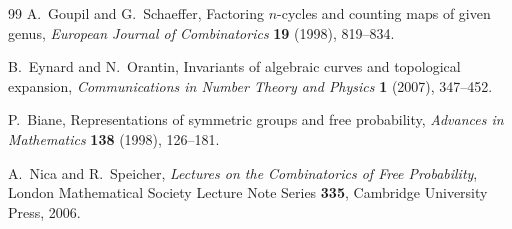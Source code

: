 \documentclass[12pt, a4paper]{amsart}
\theoremstyle{plain}
\theoremstyle{definition}
\theoremstyle{remark}
\begin{document}
\begin{thebibliography}{99}
A.~Goupil and G.~Schaeffer,
Factoring $n$-cycles and counting maps of given genus,
\emph{European Journal of Combinatorics} \textbf{19} (1998), 819--834.

B.~Eynard and N.~Orantin,
Invariants of algebraic curves and topological expansion,
\emph{Communications in Number Theory and Physics} \textbf{1} (2007), 347--452.

P.~Biane,
Representations of symmetric groups and free probability,
\emph{Advances in Mathematics} \textbf{138} (1998), 126--181.

A.~Nica and R.~Speicher,
\emph{Lectures on the Combinatorics of Free Probability},
London Mathematical Society Lecture Note Series \textbf{335},
Cambridge University Press, 2006.

\end{thebibliography}
\end{document}
